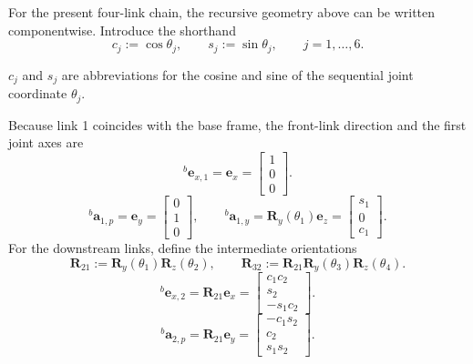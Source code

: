 \documentclass[12pt,a4paper]{report}
\newcommand{\newsymbols}[1]{\par\noindent{}#1\par\vspace{0.35em}}
\begin{document}
For the present four-link chain, the recursive geometry above can be written componentwise. Introduce the shorthand
\begin{equation}
c_j := \cos \theta_j,
\qquad
s_j := \sin \theta_j,
\qquad
j = 1,\ldots,6.
\end{equation}
\newsymbols{$c_j$ and $s_j$ are abbreviations for the cosine and sine of the sequential joint coordinate $\theta_j$.}

Because link 1 coincides with the base frame, the front-link direction and the first joint axes are
\begin{equation}
{}^{b}\mathbf{e}_{x,1} = \mathbf{e}_x =
\begin{bmatrix}
1 \\ 0 \\ 0
\end{bmatrix}.
\end{equation}
\begin{equation}
{}^{b}\mathbf{a}_{1,p} = \mathbf{e}_y =
\begin{bmatrix}
0 \\ 1 \\ 0
\end{bmatrix},
\qquad
{}^{b}\mathbf{a}_{1,y}
= \mathbf{R}_{y}(\theta_{1})\mathbf{e}_z
=
\begin{bmatrix}
s_{1} \\ 0 \\ c_{1}
\end{bmatrix}.
\end{equation}
For the downstream links, define the intermediate orientations
\begin{equation}
\mathbf{R}_{21} := \mathbf{R}_{y}(\theta_{1})\mathbf{R}_{z}(\theta_{2}),
\qquad
\mathbf{R}_{32} := \mathbf{R}_{21}\mathbf{R}_{y}(\theta_{3})\mathbf{R}_{z}(\theta_{4}).
\end{equation}
\begin{equation}
{}^{b}\mathbf{e}_{x,2}
= \mathbf{R}_{21}\mathbf{e}_x
=
\begin{bmatrix}
c_{1}c_{2} \\
s_{2} \\
-s_{1}c_{2}
\end{bmatrix}.
\end{equation}
\begin{equation}
{}^{b}\mathbf{a}_{2,p}
= \mathbf{R}_{21}\mathbf{e}_y
=
\begin{bmatrix}
-c_{1}s_{2} \\
c_{2} \\
s_{1}s_{2}
\end{bmatrix}.
\end{equation}
\end{document}
